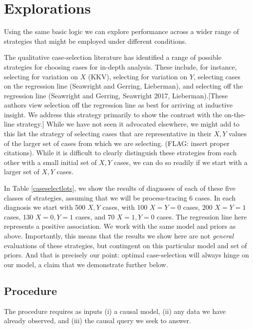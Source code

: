 \documentclass[
  12pt,
]{book}
\begin{document}
\hypertarget{explorations}{%
\section{Explorations}\label{explorations}}

Using the same basic logic we can explore performance across a wider range of strategies that might be employed under different conditions.

The qualitative case-selection literature has identified a range of possible strategies for choosing cases for in-depth analysis. These include, for instance, selecting for variation on \(X\) (KKV), selecting for variation on \(Y\), selecting cases on the regression line (Seawright and Gerring, Lieberman), and selecting off the regression line (Seawright and Gerring, Seawright 2017, Lieberman).{[}These authors view selection off the regression line as best for arriving at inductive insight. We address this strategy primarily to show the contrast with the on-the-line strategy.{]} While we have not seen it advocated elsewhere, we might add to this list the strategy of selecting cases that are representative in their \(X,Y\) values of the larger set of cases from which we are selecting. (FLAG: insert proper citations). While it is difficult to clearly distinguish these strategies from each other with a small initial set of \(X, Y\) cases, we can do so readily if we start with a larger set of \(X,Y\) cases.

In Table \ref{caseselectlots}, we show the results of diagnoses of each of these five classes of strategies, assuming that we will be process-tracing 6 cases. In each diagnosis we start with 500 \(X, Y\) cases, with 100 \(X=Y=0\) cases, 200 \(X=Y=1\) cases, 130 \(X=0, Y=1\) cases, and 70 \(X=1, Y=0\) cases. The regression line here represents a positive association. We work with the same model and priors as above. Importantly, this means that the results we show here are not \emph{general} evaluations of these strategies, but contingent on this particular model and set of priors. And that is precisely our point: optimal case-selection will always hinge on our model, a claim that we demonstrate further below.

\hypertarget{procedure}{%
\subsection{Procedure}\label{procedure}}

The procedure requires as inputs (i) a causal model, (ii) any data we have already observed, and (iii) the causal query we seek to answer.
\end{document}

